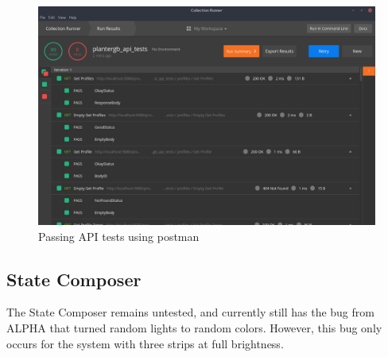 \documentclass[onecolumn, draftclsnofoot,10pt, compsoc]{IEEEtran}
\begin{document}
		\begin{center}
			\begin{figure}[H]
				\includegraphics[width=\linewidth]{tests/api_tests.png}
				\caption{Passing API tests using postman}
				\label{fig:apiTests}
			\end{figure}
		\end{center}
	\subsection{State Composer}
		\noindent The State Composer remains untested, and currently still has the bug from ALPHA that turned random lights to random colors. However, this bug only
		occurs for the system with three strips at full brightness.
		\\\\
\end{document}
